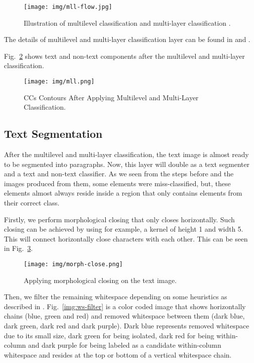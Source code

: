 \documentclass[conference]{IEEEtran}
\begin{document}
    \begin{figure}[htbp]
        \centerline{\texttt{[image: img/mll-flow.jpg]}}
        \caption{Illustration of multilevel classification and multi-layer classification \cite{mhs}.}
        \label{fig:mll}
    \end{figure}

    The details of multilevel and multi-layer classification layer can be found in \cite{mhs} and \cite{mha}.

    Fig.~\ref{img:mll} shows text and non-text components after the multilevel and multi-layer classification.

    \begin{figure}[htbp]
        \centerline{\texttt{[image: img/mll.png]}}
        \caption{CCs Contours After Applying Multilevel and Multi-Layer Classification.}
        \label{img:mll}
    \end{figure}

    \subsection{Text Segmentation}

    After the multilevel and multi-layer classification, the text image is almost ready to be
    segmented into paragraphs.
    Now, this layer will double as a text segmenter and a text and non-text classifier.
    As we seen from the steps before and the images produced from them, some elements were
    miss-classified, but, these elements almost always reside inside a region that only contains
    elements from their correct class.

    Firstly, we perform morphological closing that only closes horizontally.
    Such closing can be achieved by using for example, a kernel of height 1 and width 5.
    This will connect horizontally close characters with each other.
    This can be seen in Fig.~\ref{img:morph-close-h}.
    
    \begin{figure}[htbp]
        \centerline{\texttt{[image: img/morph-close.png]}}
        \caption{Applying morphological closing on the text image.}
        \label{img:morph-close-h}
    \end{figure}
    
    Then, we filter the remaining whitespace depending on some heuristics as described in \cite{ws}.
    Fig.~\ref{img:ws-filter} is a color coded image that shows horizontally chains
    (blue, green and red) and removed whitespace between them
    (dark blue, dark green, dark red and dark purple).
    Dark blue represents removed whitespace due to its small size, dark green for being isolated,
    dark red for being within-column and dark purple for being labeled as a candidate within-column
    whitespace and resides at the top or bottom of a vertical whitespace chain.
\end{document}
